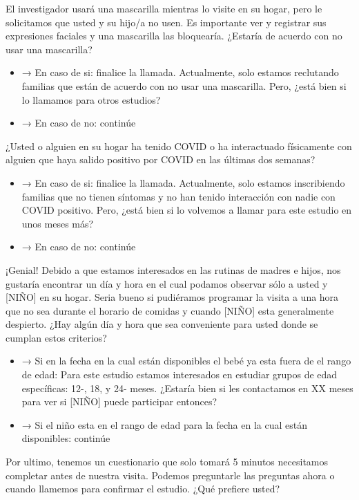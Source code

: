 \documentclass[
]{book}
\providecommand{\tightlist}{%
  \setlength{\itemsep}{0pt}\setlength{\parskip}{0pt}}
\begin{document}
El investigador usará una mascarilla mientras lo visite en su hogar, pero le solicitamos que usted y su hijo/a no usen. Es importante ver y registrar sus expresiones faciales y una mascarilla las bloquearía. ¿Estaría de acuerdo con no usar una mascarilla?

\begin{itemize}
\tightlist
\item
  → En caso de si: finalice la llamada. Actualmente, solo estamos reclutando familias que están de acuerdo con no usar una mascarilla. Pero, ¿está bien si lo llamamos para otros estudios?
\item
  → En caso de no: continúe
\end{itemize}

¿Usted o alguien en su hogar ha tenido COVID o ha interactuado físicamente con alguien que haya salido positivo por COVID en las últimas dos semanas?

\begin{itemize}
\tightlist
\item
  → En caso de si: finalice la llamada. Actualmente, solo estamos inscribiendo familias que no tienen síntomas y no han tenido interacción con nadie con COVID positivo. Pero, ¿está bien si lo volvemos a llamar para este estudio en unos meses más?
\item
  → En caso de no: continúe
\end{itemize}

¡Genial! Debido a que estamos interesados en las rutinas de madres e hijos, nos gustaría encontrar un día y hora en el cual podamos observar sólo a usted y {[}NIÑO{]} en su hogar. Seria bueno si pudiéramos programar la visita a una hora que no sea durante el horario de comidas y cuando {[}NIÑO{]} esta generalmente despierto. ¿Hay algún día y hora que sea conveniente para usted donde se cumplan estos criterios?

\begin{itemize}
\tightlist
\item
  → Si en la fecha en la cual están disponibles el bebé ya esta fuera de el rango de edad: Para este estudio estamos interesados en estudiar grupos de edad específicas: 12-, 18, y 24- meses. ¿Estaría bien si les contactamos en XX meses para ver si {[}NIÑO{]} puede participar entonces?
\item
  → Si el niño esta en el rango de edad para la fecha en la cual están disponibles: continúe
\end{itemize}

Por ultimo, tenemos un cuestionario que solo tomará 5 minutos necesitamos completar antes de nuestra visita. Podemos preguntarle las preguntas ahora o cuando llamemos para confirmar el estudio. ¿Qué prefiere usted?
\end{document}
